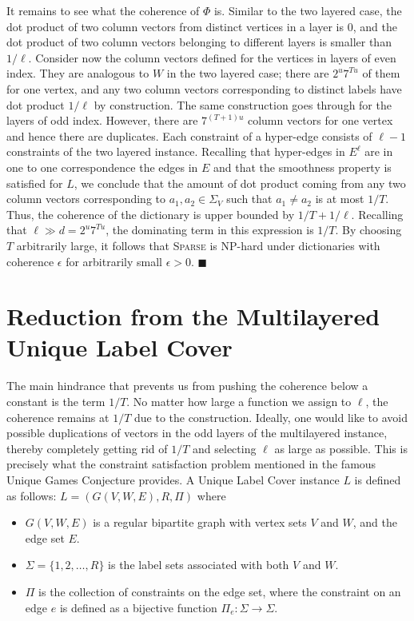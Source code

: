 \documentclass[11pt]{article}
\begin{document}
It remains to see what the coherence of $\Phi$ is. Similar to the
two layered case, the dot product of two column vectors from
distinct vertices in a layer is $0$, and the dot product of
two column vectors belonging to different layers is smaller than
$1/\ell$. Consider now the column vectors defined for the
vertices in layers of even index. They are analogous to $W$ in
the two layered case; there are $2^u 7^{Tu}$ of them for one vertex,
and any two column vectors corresponding to distinct labels
have dot product $1/\ell$ by construction. The same construction
goes through for the layers of odd index. However, there are
$7^{(T+1)u}$ column vectors for one vertex and hence there are
duplicates. Each constraint of a hyper-edge consists of $\ell-1$
constraints of the two layered instance. Recalling that hyper-edges
in $E^{\ell}$ are in one to one correspondence the edges in $E$
and that the smoothness property is satisfied for $L$, we conclude
that the amount of dot product coming from any two column
vectors corresponding to $a_1,a_2 \in \Sigma_V$ such that
$a_1 \neq a_2$ is at most $1/T$. Thus, the coherence of the
dictionary is upper bounded by $1/T+1/\ell$. Recalling that $\ell \gg d = 2^u 7^{Tu}$,
the dominating term in this expression is $1/T$. By choosing
$T$ arbitrarily large, it follows that \textsc{Sparse} is \textsf{NP}-hard
under dictionaries with coherence $\epsilon$ for arbitrarily
small $\epsilon > 0$. \hfill $\blacksquare$

\section{Reduction from the Multilayered Unique Label Cover}
The main hindrance that prevents us from pushing the coherence
below a constant is the term $1/T$. No matter how large
a function we assign to $\ell$, the coherence
remains at $1/T$ due to the construction. Ideally, one would like
to avoid possible duplications of vectors in the odd
layers of the multilayered instance, thereby completely getting
rid of $1/T$ and selecting $\ell$ as large as possible.
This is precisely what the constraint satisfaction problem
mentioned in the famous Unique Games Conjecture provides.
A Unique Label Cover instance $L$ is defined as follows:
$L = (G(V,W,E),R,\Pi)$ where

\begin{itemize}
\item $G(V,W,E)$ is a regular bipartite graph with vertex sets $V$
and $W$, and the edge set $E$. \vspace{1mm}

\item $\Sigma=\{1,2,\hdots,R\}$ is the label sets associated with
both $V$ and $W$. \vspace{1mm}

\item $\Pi$ is the collection of constraints on the edge set,
where the constraint on an edge $e$ is defined as a bijective
function $\Pi_e\colon \Sigma \rightarrow \Sigma$.
\end{itemize}
\end{document}
